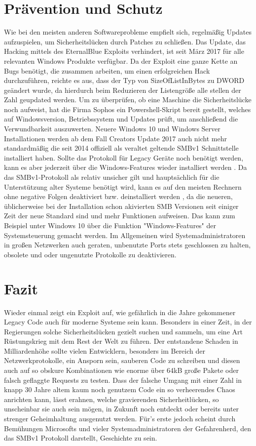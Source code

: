 \documentclass[DIV=12,headings=normal,pdftex,headinclude=false,footinclude=false,final]{scrreprt}
\begin{document}
\chapter{Prävention und Schutz}
Wie bei den meisten anderen Softwareprobleme empfielt sich, regelmäßig Updates aufzuspielen, um Sicherheitslücken durch Patches zu schließen. Das Update, das Hacking mittels des EternalBlue Exploits verhindert, ist seit März 2017 für alle relevanten Windows Produkte verfügbar.
Da der Exploit eine ganze Kette an Bugs benötigt, die zusammen arbeiten, um einen erfolgreichen Hack durchzuführen, reichte es aus, dass der Typ von SizeOfListInBytes zu DWORD geändert wurde\cite{Scad:EB}, da hierdurch beim Reduzieren der Listengröße alle stellen der Zahl geupdated werden.
Um zu überprüfen, ob eine Maschine die Sicherheitslücke noch aufweist, hat die Firma Sophos ein Powershell-Skript bereit gestellt, welches auf Windowsversion, Betriebssystem und Updates prüft, um anschließend die Verwundbarkeit auszuwerten\cite{SAV}. 
Neuere Windows 10 und Windows Server Installationen werden ab dem Fall Creators Update 2017 auch nicht mehr standardmäßig die seit 2014 offiziell als veraltet geltende SMBv1 Schnittstelle installiert haben. Sollte das Protokoll für Legacy Geräte noch benötigt werden, kann es aber jederzeit über die Windows-Features wieder installiert werden \cite{MS:Fix}.
Da das SMBv1-Protokoll als relativ unsicher gilt und hauptsächlich für die Unterstützung alter Systeme benötigt wird, kann es auf den meisten Rechnern ohne negative Folgen deaktiviert bzw. deinstalliert werden \cite{WP}, da die neueren, üblicherweise bei der Installation schon akivierten SMB Versionen  seit einiger Zeit der neue Standard sind und mehr Funktionen aufweisen. Das kann zum Beispiel unter Windows 10 über die Funktion "Windows-Features" der Systemsteuerung gemacht werden.
Im Allgemeinen wird Systemadministratoren in großen Netzwerken auch geraten, unbenutzte Ports stets geschlossen zu halten, obsolete und oder ungenutzte Protokolle zu deaktivieren.\cite{TM:EB}

\chapter{Fazit}
Wieder einmal zeigt ein Exploit auf, wie gefährlich in die Jahre gekommener Legacy Code auch für moderne Systeme sein kann. Besonders in einer Zeit, in der Regierungen solche Sicherheitslücken gezielt suchen und sammeln, um eine Art Rüstungskrieg mit dem Rest der Welt zu führen.
Der entstandene Schaden in Milliardenhöhe sollte vielen Entwicklern, besonders im Bereich der Netzwerkprotokolle, ein Ansporn sein, sauberen Code zu schreiben und diesen auch auf so obskure Kombinationen wie enorme über 64kB große Pakete oder falsch geflaggte Requests zu testen. Dass der falsche Umgang mit einer Zahl in knapp 30 Jahre altem kaum noch genutzem Code ein so verheerendes Chaos anrichten kann, lässt erahnen, welche gravierenden Sicherheitlücken, so unscheinbar sie auch sein mögen, in Zukunft noch entdeckt oder bereits unter strenger Geheimhaltung ausgenutzt werden. Für's erste jedoch scheint durch Bemühungen Microsofts und vieler Systemadministratoren der Gefahrenherd, den das SMBv1 Protokoll darstellt, Geschichte zu sein.

\clearpage
\label{sec:sources}
\renewcommand{\bibname}{Quellenverzeichnis}


\end{document}
